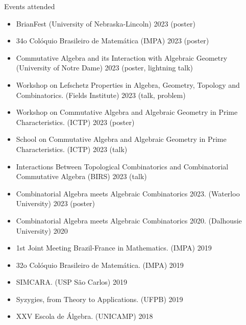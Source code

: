 \documentclass{resume} %
\begin{document}
\begin{rSection}{Events attended}

    \begin{itemize}[label={}]
        \item BrianFest (University of Nebraska-Lincoln) 2023 (poster)
        \item 34o Colóquio Brasileiro de Matemática (IMPA) 2023 (poster)
        \item Commutative Algebra and its Interaction with Algebraic Geometry (University of Notre Dame) 2023 (poster, lightning talk)
        \item Workshop on Lefschetz Properties in Algebra, Geometry, Topology and Combinatorics. (Fields Institute) 2023 (talk, problem)
        \item Workshop on Commutative Algebra and Algebraic Geometry in Prime Characteristics. (ICTP) 2023 (poster)
        \item School on Commutative Algebra and Algebraic Geometry in Prime Characteristics. (ICTP) 2023 (talk)
        \item Interactions Between Topological Combinatorics and Combinatorial Commutative Algebra (BIRS) 2023 (talk)
        \item Combinatorial Algebra meets Algebraic Combinatorics 2023. (Waterloo University) 2023 (poster)
        \item Combinatorial Algebra meets Algebraic Combinatorics 2020. (Dalhousie University) 2020
        \item 1st Joint Meeting Brazil-France in Mathematics. (IMPA) 2019
        \item 32o Colóquio Brasileiro de Matemática. (IMPA) 2019
        \item SIMCARA. (USP São Carlos) 2019
        \item Syzygies, from Theory to Applications. (UFPB) 2019
        \item XXV Escola de Álgebra. (UNICAMP) 2018
    \end{itemize}

\end{rSection}
\end{document}
